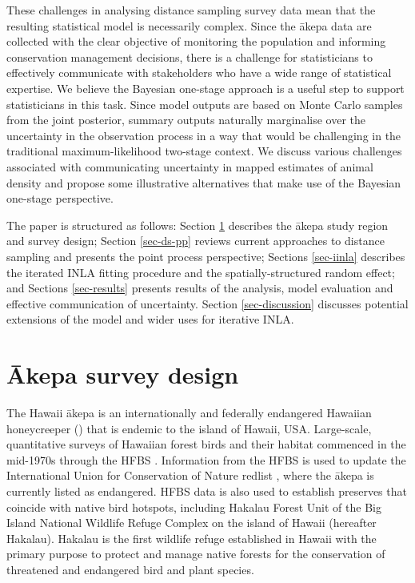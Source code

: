 \documentclass{statsoc}
\newcommand{\akepa}{\textquotesingle\={a}kepa}  %
\newcommand{\Akepa}{\textquotesingle\={A}kepa}  %
\newcommand{\hawaii}{Hawai\textquotesingle i}   %
\begin{document}
These challenges in analysing distance sampling survey data mean that the resulting statistical model is necessarily complex. Since the \akepa{} data are collected with the clear objective of monitoring the population and informing conservation management decisions, there is a challenge for statisticians to effectively communicate with stakeholders who have a wide range of statistical expertise. We believe the Bayesian one-stage approach is a useful step to support statisticians in this task.  Since model outputs are based on Monte Carlo samples from the joint posterior, summary outputs naturally marginalise over the uncertainty in the observation process in a way that would be challenging in the traditional maximum-likelihood two-stage context.  We discuss various challenges associated with communicating uncertainty in mapped estimates of animal density and propose some illustrative alternatives that make use of the Bayesian one-stage perspective.

The paper is structured as follows:  Section \ref{sec-study-design} describes the \akepa{} study region and survey design; Section \ref{sec-ds-pp} reviews current approaches to distance sampling and presents the point process perspective; Sections \ref{sec-iinla} describes the iterated INLA fitting procedure and the spatially-structured random effect; and Sections \ref{sec-results} presents results of the analysis, model evaluation and effective communication of uncertainty.  Section \ref{sec-discussion} discusses potential extensions of the model and wider uses for iterative INLA.

\section{\Akepa{} survey design}
\label{sec-study-design}

The \hawaii{} \akepa{} is an internationally and federally endangered Hawaiian honeycreeper (\citealp{usfws_akepa_1970, birdlife_akepa_2016}) that is endemic to the island of \hawaii{}, USA.  Large-scale, quantitative surveys of Hawaiian forest birds and their habitat commenced in the mid-1970s through the HFBS \citep{scott_HFBS_1986}. Information from the HFBS is used to update the International Union for Conservation of Nature redlist \citep{iucn_redlist_2022}, where the \akepa{} is currently listed as endangered. HFBS data is also used to establish preserves that coincide with native bird hotspots, including Hakalau Forest Unit of the Big Island National Wildlife Refuge Complex on the island of \hawaii{} (hereafter Hakalau).  Hakalau is the first wildlife refuge established in \hawaii{} with the primary purpose to protect and manage native forests for the conservation of threatened and endangered bird and plant species.
\end{document}
